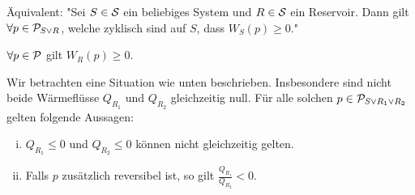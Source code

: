Äquivalent:
"Sei $S \in \S$ ein beliebiges System und $R \in \S$ ein Reservoir.
Dann gilt $\forall p \in \P_{S \vee R}$, welche zyklisch sind auf $S$,
dass $W_S(p) \geq 0$."


\begin{bemerkung}
    $\forall p \in \P$ gilt $W_R(p) \geq 0$.
\end{bemerkung}

\begin{lemma}
    Wir betrachten eine Situation wie unten beschrieben. Insbesondere sind
    nicht beide Wärmeflüsse $Q_{R_1}$ und $Q_{R_2}$ gleichzeitig null. Für
    alle solchen $p \in \P_{S \vee R_1 \vee R_2}$ gelten folgende Aussagen:
    \begin{enumerate}[(i)]
        \item $Q_{R_1} \leq 0$ und $Q_{R_2} \leq 0$ können nicht gleichzeitig gelten.
        \item Falls $p$ zusätzlich reversibel ist, so gilt $\frac{Q_{R_1}}{Q_{R_2}} < 0$.
    \end{enumerate}
\end{lemma}

